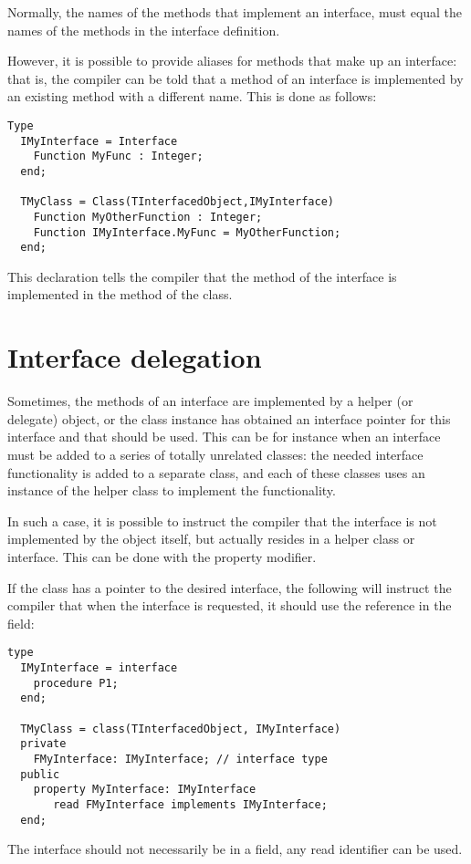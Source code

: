 Normally, the names of the methods that implement an interface, must 
equal the names of the methods in the interface definition.

However, it is possible to provide aliases for methods that make up an
interface: that is, the compiler can be told that a method of an interface 
is implemented by an existing method with a different name. 
This is done as follows:
\begin{verbatim}
Type
  IMyInterface = Interface
    Function MyFunc : Integer;
  end;

  TMyClass = Class(TInterfacedObject,IMyInterface)
    Function MyOtherFunction : Integer;
    Function IMyInterface.MyFunc = MyOtherFunction;
  end;
\end{verbatim}
This declaration tells the compiler that the  method of
the  interface is implemented in the 
method of the  class.

\section{Interface delegation}
Sometimes, the methods of an interface are implemented by a helper (or
delegate) object, or the class instance has obtained an interface pointer for
this interface and that should be used. This can be for instance when an
interface must be added to a series of totally unrelated classes: the needed
interface functionality is added to a separate class, and each of these
classes uses an instance of the helper class to implement the functionality.

In such a case, it is possible to instruct the compiler that the interface 
is not implemented by the object itself, but actually resides in a helper 
class or interface. This can be done with the  property modifier.

If the class has a pointer to the desired interface, the following will
instruct the compiler that when the  interface is
requested, it should use the reference in the field:
\begin{verbatim}
type
  IMyInterface = interface
    procedure P1;
  end;
 
  TMyClass = class(TInterfacedObject, IMyInterface)
  private
    FMyInterface: IMyInterface; // interface type
  public
    property MyInterface: IMyInterface 
       read FMyInterface implements IMyInterface;
  end;
\end{verbatim}
The interface should not necessarily be in a field, any read identifier can
be used. 


